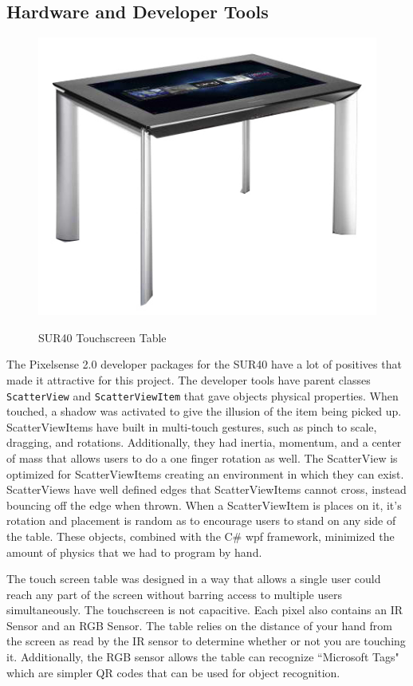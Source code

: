 \documentclass{article}
\begin{document}
\subsection{Hardware and Developer Tools}

\begin{figure}[t!]
\centering
\scalebox{1}
{\includegraphics{SUR40.jpg}}
\caption{SUR40 Touchscreen Table}
\label{Fig:table}
\end{figure}

The Pixelsense 2.0 developer packages for the SUR40 have a lot of positives that made it attractive for this project.  The developer tools have parent classes \texttt{ScatterView} and \texttt{ScatterViewItem} that gave objects physical properties.  When touched, a shadow was activated to give the illusion of the item being picked up.  ScatterViewItems have built in multi-touch gestures, such as pinch to scale, dragging, and rotations. Additionally, they had inertia, momentum, and a center of mass that allows users to do a one finger rotation as well.  The ScatterView is optimized for ScatterViewItems creating an environment in which they can exist.  ScatterViews have well defined edges that ScatterViewItems cannot cross, instead bouncing off the edge when thrown.  When a ScatterViewItem is places on it, it's rotation and placement is random as to encourage users to stand on any side of the table.  These objects, combined with the C\# wpf framework, minimized the amount of physics that we had to program by hand.

The touch screen table was designed in a way that allows a single user could reach any part of the screen without barring access to multiple users simultaneously.  The touchscreen is not capacitive.  Each pixel also contains an IR Sensor and an RGB Sensor.  The table relies on the distance of your hand from the screen as read by the IR sensor to determine whether or not you are touching it.  Additionally, the RGB sensor allows the table can recognize ``Microsoft Tags" which are simpler QR codes that can be used for object recognition.  
\end{document}
